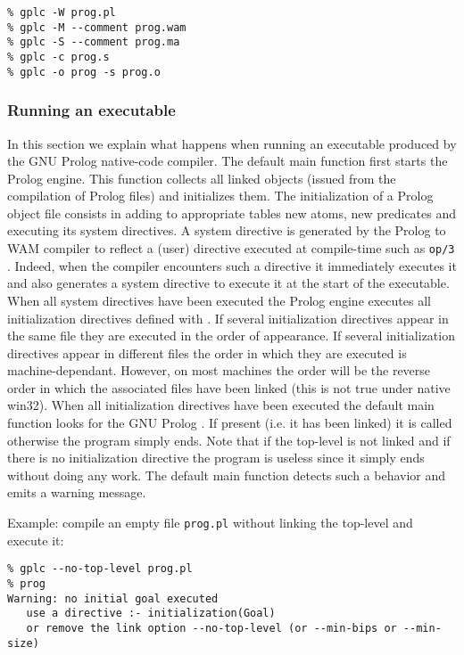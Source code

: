 \begin{Indentation}
\begin{verbatim}
% gplc -W prog.pl
% gplc -M --comment prog.wam
% gplc -S --comment prog.ma
% gplc -c prog.s
% gplc -o prog -s prog.o
\end{verbatim}
\end{Indentation}

\subsubsection{Running an executable}
\label{Running-an-executable}
In this section we explain what happens when running an executable produced
by the GNU Prolog native-code compiler. The default main function first starts
the Prolog engine. This function collects all linked objects (issued from the
compilation of Prolog files) and initializes them. The initialization of a
Prolog object file consists in adding to appropriate tables new atoms, new
predicates and executing its system directives. A system directive is
generated by the Prolog to WAM compiler to reflect a (user) directive
executed at compile-time such as \texttt{op/3} . Indeed, when the
compiler encounters such a directive it immediately executes it and also
generates a system directive to execute it at the start of the executable.
When all system directives have been executed the Prolog engine executes all
initialization directives defined with 
.  If several initialization directives appear in the
same file they are executed in the order of appearance. If several
initialization directives appear in different files the order in which they
are executed is machine-dependant. However, on most machines the order will
be the reverse order in which the associated files have been linked (this is
not true under native win32). When all initialization directives have been
executed the default main function looks for the GNU Prolog
. If present (i.e. it has been linked) it is called otherwise
the program simply ends. Note that if the top-level is not linked and if
there is no initialization directive the program is useless since it simply
ends without doing any work. The default main function detects such a
behavior and emits a warning message.

Example: compile an empty file \texttt{prog.pl} without linking the
top-level and execute it:

\begin{Indentation}
\begin{verbatim}
% gplc --no-top-level prog.pl
% prog
Warning: no initial goal executed
   use a directive :- initialization(Goal)
   or remove the link option --no-top-level (or --min-bips or --min-size)
\end{verbatim}
\end{Indentation}

